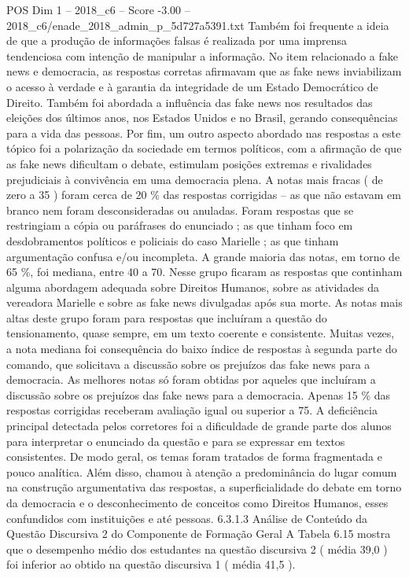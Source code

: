 \begin{textsample}{POS Dim 1 – 2018\_c6 – Score -3.00 – 2018\_c6/enade\_2018\_admin\_p\_5d727a5391.txt}
Também foi frequente a ideia de que a produção de informações falsas é realizada por uma imprensa tendenciosa com intenção de manipular a informação.
No item relacionado a fake news e democracia, as respostas corretas afirmavam que as fake news inviabilizam o acesso à verdade e à garantia da integridade de um Estado Democrático de Direito.
Também foi abordada a influência das fake news nos resultados das eleições dos últimos anos, nos Estados Unidos e no Brasil, gerando consequências para a vida das pessoas.
Por fim, um outro aspecto abordado nas respostas a este tópico foi a polarização da sociedade em termos políticos, com a afirmação de que as fake news dificultam o debate, estimulam posições extremas e rivalidades prejudiciais à convivência em uma democracia plena.
A notas mais fracas ( de zero a 35 ) foram cerca de 20 \% das respostas corrigidas – as que não estavam em branco nem foram desconsideradas ou anuladas.
Foram respostas que se restringiam a cópia ou paráfrases do enunciado ; as que tinham foco em desdobramentos políticos e policiais do caso Marielle ; as que tinham argumentação confusa e/ou incompleta.
A grande maioria das notas, em torno de 65 \%, foi mediana, entre 40 a 70.
Nesse grupo ficaram as respostas que continham alguma abordagem adequada sobre Direitos Humanos, sobre as atividades da vereadora Marielle e sobre as fake news divulgadas após sua morte.
As notas mais altas deste grupo foram para respostas que incluíram a questão do tensionamento, quase sempre, em um texto coerente e consistente.
Muitas vezes, a nota mediana foi consequência do baixo índice de respostas à segunda parte do comando, que solicitava a discussão sobre os prejuízos das fake news para a democracia.
As melhores notas só foram obtidas por aqueles que incluíram a discussão sobre os prejuízos das fake news para a democracia.
Apenas 15 \% das respostas corrigidas receberam avaliação igual ou superior a 75.
A deficiência principal detectada pelos corretores foi a dificuldade de grande parte dos alunos para interpretar o enunciado da questão e para se expressar em textos consistentes.
De modo geral, os temas foram tratados de forma fragmentada e pouco analítica.
Além disso, chamou à atenção a predominância do lugar comum na construção argumentativa das respostas, a superficialidade do debate em torno da democracia e o desconhecimento de conceitos como Direitos Humanos, esses confundidos com instituições e até pessoas. 6.3.1.3 Análise de Conteúdo da Questão Discursiva 2 do Componente de Formação Geral A Tabela 6.15 mostra que o desempenho médio dos estudantes na questão discursiva 2 ( média 39,0 ) foi inferior ao obtido na questão discursiva 1 ( média 41,5 ).

\end{textsample}
